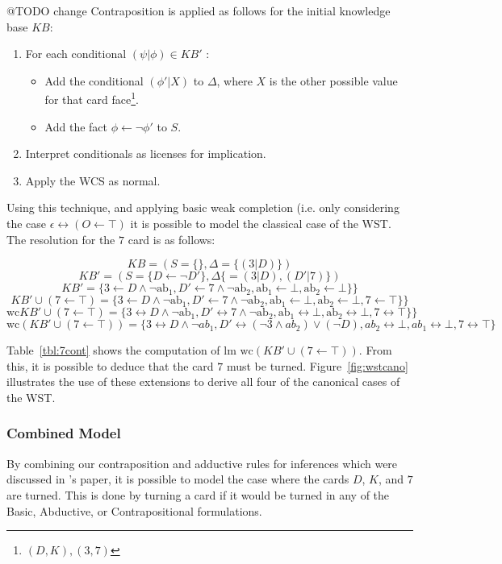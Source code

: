 @TODO change
Contraposition is applied as follows for the initial knowledge base $KB$:
\begin{enumerate}
\item For each conditional $(\psi|\phi)\in KB'$ :
\begin{itemize}
\item Add the conditional $(\phi'|X)$ to $\Delta$, where $X$ is the other possible value for that card face\footnote{$(D,K),(3,7)$}.
\item Add the fact $\phi\leftarrow \lnot \phi'$ to $S$.
\end{itemize}
\item Interpret conditionals as licenses for implication.
\item Apply the WCS as normal.
\end{enumerate}

Using this technique, and applying basic weak completion (i.e. only considering the case $\epsilon\leftrightarrow(O\leftarrow \top)$ it is possible to model the classical case of the WST. The resolution for the $7$ card is as follows:

\[
KB = (S=\{\},\Delta=\{(3|D)\})
\]
\[
KB' = (S=\{D \leftarrow  \lnot D'\},\Delta\{=(3|D),(D'|7)\})
\]
\[
KB' = \{3 \leftarrow D \land \lnot \text{ab}_1, D' \leftarrow 7 \land \lnot \text{ab}_2, \text{ab}_1 \leftarrow \bot, \text{ab}_2 \leftarrow \bot\}\}
\]
\[
KB'\cup (7\leftarrow\top) = \{3 \leftarrow D \land \lnot \text{ab}_1, D' \leftarrow 7 \land \lnot \text{ab}_2, \text{ab}_1 \leftarrow \bot, \text{ab}_2 \leftarrow \bot, 7 \leftarrow \top\}\}
\]
\[
\text{wc}KB'\cup (7\leftarrow\top) = \{3 \leftrightarrow D \land \lnot \text{ab}_1, D' \leftrightarrow 7 \land \lnot \text{ab}_2, \text{ab}_1 \leftrightarrow \bot, \text{ab}_2 \leftrightarrow \bot, 7 \leftrightarrow \top\}\}
\]
\begin{equation} \label{eqn:wst_contra}
\textrm{wc} (KB'\cup (7\leftarrow\top)) = \{3 \leftrightarrow D \land \lnot ab_1, D' \leftrightarrow (\lnot 3 \land ab_2) \lor (\lnot D),  ab_2\leftrightarrow \bot, ab_1\leftrightarrow \bot, 7\leftrightarrow\top \}
\end{equation}

Table~\ref{tbl:7cont} shows the computation of $\textrm{lm wc} (KB'\cup (7\leftarrow\top))$. From this, it is possible to deduce that the card $7$ must be turned. Figure~\ref{fig:wstcano} illustrates the use of these extensions to derive all four of the canonical cases of the WST.

\subsubsection*{Combined Model}
By combining our contraposition and adductive rules for inferences which were discussed in \citep{dietz2012computational}'s paper, it is possible to model the case where the cards $D$, $K$, and $7$ are turned. This is done by turning a card if it would be turned in any of the Basic, Abductive, or Contrapositional formulations.

